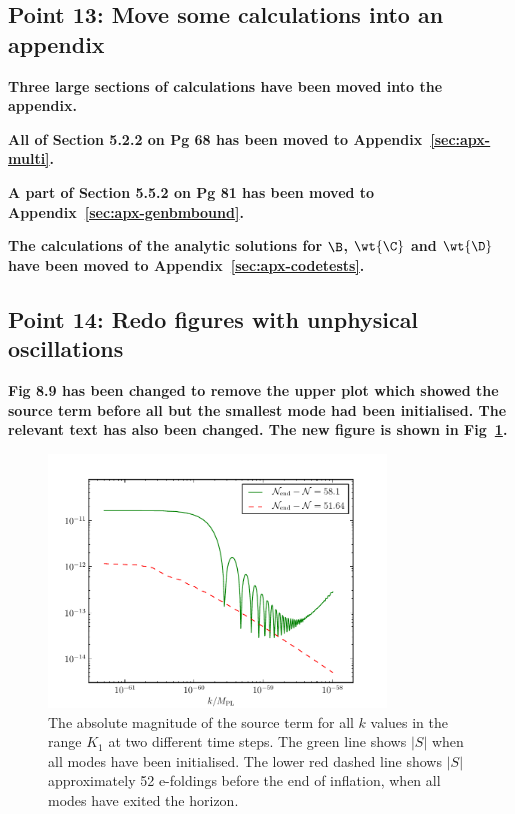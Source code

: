 \subsection{Point 13: Move some calculations into an appendix}
\textbf{Three large sections of calculations have been moved into the appendix.}

\textbf{All of Section 5.2.2 on Pg 68 has been moved to Appendix~\ref{sec:apx-multi}.}

\textbf{A part of Section 5.5.2 on Pg 81 has been moved to Appendix~\ref{sec:apx-genbmbound}.}

\textbf{The calculations of the analytic solutions for $\B$, $\wt{\C}$ and $\wt{\D}$ have been
moved to Appendix~\ref{sec:apx-codetests}.}

\subsection{Point 14: Redo figures with unphysical oscillations}
\textbf{Fig 8.9 has been changed to remove the upper plot which showed the source term before all
but the smallest mode had been initialised. The relevant text has also been changed. The new figure
is shown in Fig~\ref{fig:src-3ns-2}.}

\begin{figure}[htbp]
\centering
\includegraphics[width=0.8\textwidth]{numerical/graphs/src_3ns-large}
\caption[Source Term at Two Different Times]{The absolute magnitude of the source 
term for all $k$ values in the range $K_1$ at two different time steps. The green line shows
$|S|$ when all modes have been initialised. The lower red dashed line shows $|S|$ approximately 
52 e-foldings before the end of inflation, when all modes have
exited the horizon.}
\label{fig:src-3ns-2}
\end{figure}

